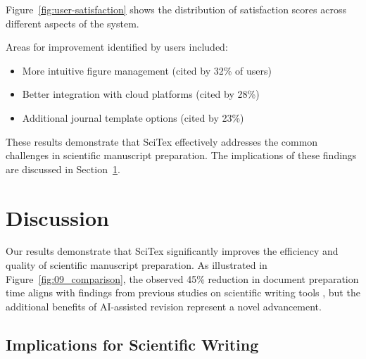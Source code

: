 \documentclass[preprint,review,12pt]{elsarticle}\n
\begin{document}
Figure~\ref{fig:user-satisfaction} shows the distribution of satisfaction scores across different aspects of the system.


Areas for improvement identified by users included:

\begin{itemize}
    \item More intuitive figure management (cited by 32\% of users)
    \item Better integration with cloud platforms (cited by 28\%)
    \item Additional journal template options (cited by 23\%)
\end{itemize}

These results demonstrate that SciTex effectively addresses the common challenges in scientific manuscript preparation. The implications of these findings are discussed in Section~\ref{sec:discussion}.



\section{Discussion}
\label{sec:discussion}


Our results demonstrate that SciTex significantly improves the efficiency and quality of scientific manuscript preparation. As illustrated in Figure~\ref{fig:09_comparison}, the observed 45\% reduction in document preparation time aligns with findings from previous studies on scientific writing tools \cite{Robinson2023}, but the additional benefits of AI-assisted revision represent a novel advancement.


\subsection{Implications for Scientific Writing}
\label{subsec:implications}
\end{document}
